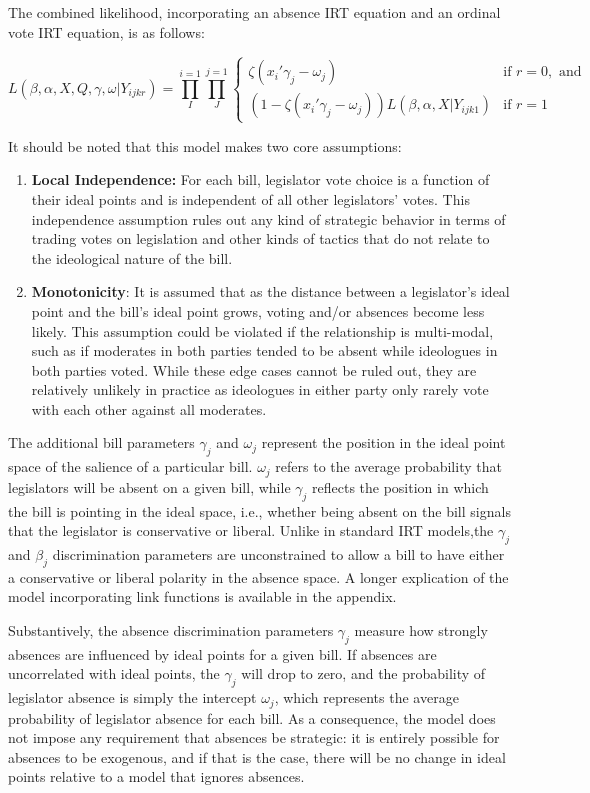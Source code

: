 	
	
	The combined likelihood, incorporating an absence IRT equation and an ordinal vote IRT equation, is as follows:
	
		 \[
	L(\beta,\alpha,X,Q,\gamma,\omega|Y_{ijkr}) = 
	\prod_{I}^{i=1} \prod_{J}^{j=1}
	\begin{cases}
	\zeta(x_{i}'\gamma_j - \omega_j ) & \text{if } r=0, \text{ and} \\
	(1-\zeta({x_{i}'\gamma_j - \omega_j}))L(\beta,\alpha,X|Y_{ijk1}) & \text{if } r=1
	\end{cases}
	\]
	
	It should be noted that this model makes two core assumptions:
	
	\begin{enumerate}
		\item \textbf{Local Independence:} For each bill, legislator vote choice is a function of their ideal points and is independent of all other legislators' votes. This independence assumption rules out any kind of strategic behavior in terms of trading votes on legislation and other kinds of tactics that do not relate to the ideological nature of the bill.
		\item \textbf{Monotonicity}: It is assumed that as the distance between a legislator's ideal point and the bill's ideal point grows, voting and/or absences become less likely. This assumption could be violated if the relationship is multi-modal, such as if moderates in both parties tended to be absent while ideologues in both parties voted. While these edge cases cannot be ruled out, they are relatively unlikely in practice as ideologues in either party only rarely vote with each other against all moderates.
	\end{enumerate}
	
	The additional bill parameters $\gamma_j$ and $\omega_j$ represent the position in the ideal point space of the salience of a particular bill. $\omega_j$ refers to the average probability that legislators will be absent on a given bill, while $\gamma_j$ reflects the position in which the bill is pointing in the ideal space, i.e., whether being absent on the bill signals that the legislator is conservative or liberal. Unlike in standard IRT models,the $\gamma_j$ and $\beta_j$ discrimination parameters are unconstrained to allow a bill to have either a conservative or liberal polarity in the absence space. A longer explication of the model incorporating link functions is available in the appendix. 
	
	Substantively, the absence discrimination parameters $\gamma_j$ measure how strongly absences are influenced by ideal points for a given bill. If absences are uncorrelated with ideal points, the $\gamma_j$ will drop to zero, and the probability of legislator absence is simply the intercept $\omega_j$, which represents the average probability of legislator absence for each bill. As a consequence, the model does not impose any requirement that absences be strategic: it is entirely possible for absences to be exogenous, and if that is the case, there will be no change in ideal points relative to a model that ignores absences.
	
